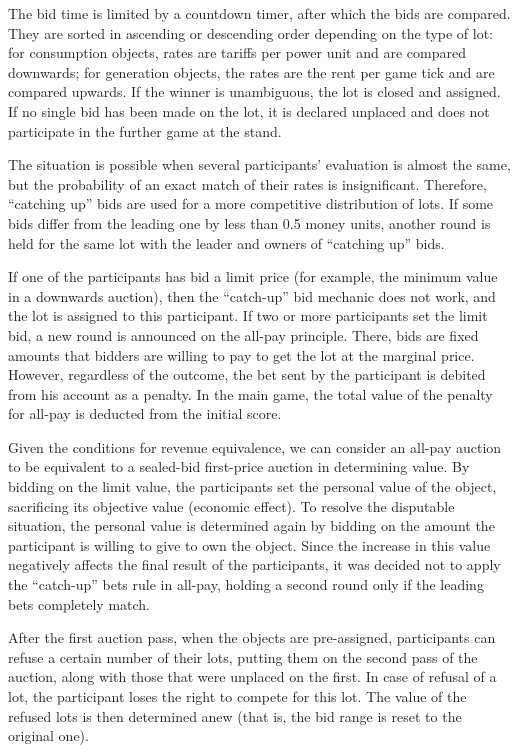 \documentclass[
]{ceurart}
\begin{document}
The bid time is limited by a countdown timer, after which the bids are compared. They are sorted in ascending or descending order depending on the type of lot: for consumption objects, rates are tariffs per power unit and are compared downwards; for generation objects, the rates are the rent per game tick and are compared upwards. If the winner is unambiguous, the lot is closed and assigned. If no single bid has been made on the lot, it is declared unplaced and does not participate in the further game at the stand.

The situation is possible when several participants’ evaluation is almost the same, but the probability of an exact match of their rates is insignificant. Therefore, ``catching up'' bids are used for a more competitive distribution of lots. If some bids differ from the leading one by less than 0.5 money units, another round is held for the same lot with the leader and owners of ``catching up'' bids.

If one of the participants has bid a limit price (for example, the minimum value in a downwards auction), then the ``catch-up'' bid mechanic does not work, and the lot is assigned to this participant. If two or more participants set the limit bid, a new round is announced on the all-pay principle. There, bids are fixed amounts that bidders are willing to pay to get the lot at the marginal price. However, regardless of the outcome, the bet sent by the participant is debited from his account as a penalty. In the main game, the total value of the penalty for all-pay is deducted from the initial score.

Given the conditions for revenue equivalence, we can consider an all-pay auction to be equivalent to a sealed-bid first-price auction in determining value. By bidding on the limit value, the participants set the personal value of the object, sacrificing its objective value (economic effect). To resolve the disputable situation, the personal value is determined again by bidding on the amount the participant is willing to give to own the object. Since the increase in this value negatively affects the final result of the participants, it was decided not to apply the ``catch-up'' bets rule in all-pay, holding a second round only if the leading bets completely match.

After the first auction pass, when the objects are pre-assigned, participants can refuse a certain number of their lots, putting them on the second pass of the auction, along with those that were unplaced on the first. In case of refusal of a lot, the participant loses the right to compete for this lot. The value of the refused lots is then determined anew (that is, the bid range is reset to the original one).
\end{document}
